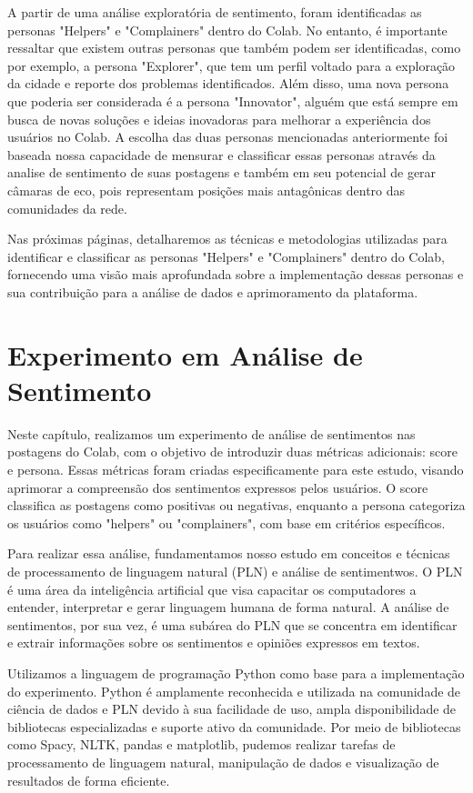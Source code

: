 A partir de uma análise exploratória de sentimento, foram identificadas as personas "Helpers" e "Complainers" dentro do Colab. No entanto, é importante ressaltar que existem outras personas que também podem ser identificadas, como por exemplo, a persona "Explorer", que tem um perfil voltado para a exploração da cidade e reporte dos problemas identificados. Além disso, uma nova persona que poderia ser considerada é a persona "Innovator", alguém que está sempre em busca de novas soluções e ideias inovadoras para melhorar a experiência dos usuários no Colab. A escolha das duas personas mencionadas anteriormente foi baseada nossa capacidade de mensurar e classificar essas personas através da analise de sentimento de suas postagens e também em seu potencial de gerar câmaras de eco, pois representam posições mais antagônicas dentro das comunidades da rede.

Nas próximas páginas, detalharemos as técnicas e metodologias utilizadas para identificar e classificar as personas "Helpers" e "Complainers" dentro do Colab, fornecendo uma visão mais aprofundada sobre a implementação dessas personas e sua contribuição para a análise de dados e aprimoramento da plataforma.

\section{Experimento em Análise de Sentimento}
Neste capítulo, realizamos um experimento de análise de sentimentos nas postagens do Colab, com o objetivo de introduzir duas métricas adicionais: score e persona. Essas métricas foram criadas especificamente para este estudo, visando aprimorar a compreensão dos sentimentos expressos pelos usuários. O score classifica as postagens como positivas ou negativas, enquanto a persona categoriza os usuários como "helpers" ou "complainers", com base em critérios específicos.

Para realizar essa análise, fundamentamos nosso estudo em conceitos e técnicas de processamento de linguagem natural (PLN) e análise de sentimentwos. O PLN é uma área da inteligência artificial que visa capacitar os computadores a entender, interpretar e gerar linguagem humana de forma natural. A análise de sentimentos, por sua vez, é uma subárea do PLN que se concentra em identificar e extrair informações sobre os sentimentos e opiniões expressos em textos.

Utilizamos a linguagem de programação Python como base para a implementação do experimento. Python é amplamente reconhecida e utilizada na comunidade de ciência de dados e PLN devido à sua facilidade de uso, ampla disponibilidade de bibliotecas especializadas e suporte ativo da comunidade. Por meio de bibliotecas como Spacy, NLTK, pandas e matplotlib, pudemos realizar tarefas de processamento de linguagem natural, manipulação de dados e visualização de resultados de forma eficiente.

